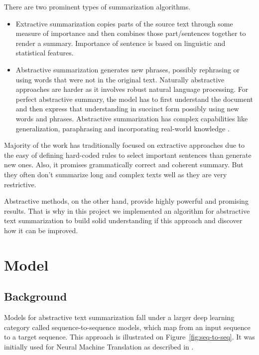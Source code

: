 There are two prominent types of summarization algorithms.

\begin{itemize}
	\item Extractive summarization copies parts of the source text through some measure of importance and then combines those part/sentences together to render a summary. Importance of sentence is based on linguistic and statistical features.

	\item Abstractive summarization generates new phrases, possibly rephrasing or using words that were not in the original text. Naturally abstractive approaches are harder as it involves robust natural language processing. For perfect abstractive summary, the model has to first understand the document and then express that understanding in succinct form possibly using new words and phrases.  Abstractive summarization has complex capabilities like generalization, paraphrasing and incorporating  real-world knowledge \cite{abstractive_text_summarization}.
\end{itemize}

Majority of the work has traditionally focused on extractive approaches due to the easy of defining hard-coded rules to select important sentences than generate new ones. Also, it promises grammatically correct and coherent summary. But they often don’t summarize long and complex texts well as they are very restrictive.


Abstractive methods, on the other hand, provide highly powerful and promising results. That is why in this project we implemented an algorithm for abstractive text summarization to build solid understanding if this approach and discover how it can be improved.


\section{Model}
\subsection{Background}
Models for abstractive text summarization fall under a larger deep learning category called
sequence-to-sequence models, which map from an input sequence to a target sequence. This approach is illustrated on Figure~\ref{fig:seq-to-seq}. It was initially used for Neural Machine Translation as described in \cite{attention_based_NMT}. 


